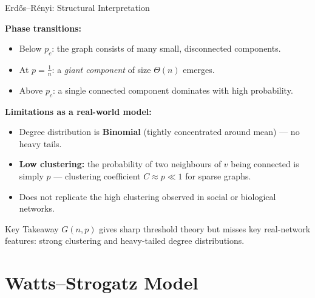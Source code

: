 \documentclass[t]{beamer}
\begin{document}
\begin{frame}{Erd\H{o}s--R\'{e}nyi: Structural Interpretation}
\footnotesize

\textbf{Phase transitions:}
\begin{itemize}
  \item Below $p_c$: the graph consists of many small, disconnected components.
  \item At $p = \frac{1}{n}$: a \emph{giant component} of size $\Theta(n)$ emerges.
  \item Above $p_c$: a single connected component dominates with high probability.
\end{itemize}

\smallskip

\textbf{Limitations as a real-world model:}
\begin{itemize}
  \item Degree distribution is \textbf{Binomial} (tightly concentrated around mean) — no heavy tails.
  \item \textbf{Low clustering:} the probability of two neighbours of $v$ being connected
        is simply $p$ — clustering coefficient $C \approx p \ll 1$ for sparse graphs.
  \item Does not replicate the high clustering observed in social or biological networks.
\end{itemize}

\begin{alertblock}{Key Takeaway}
  $G(n,p)$ gives sharp threshold theory but misses key real-network features:
  strong clustering and heavy-tailed degree distributions.
\end{alertblock}

\end{frame}

\section{Watts--Strogatz Model}
\end{document}
